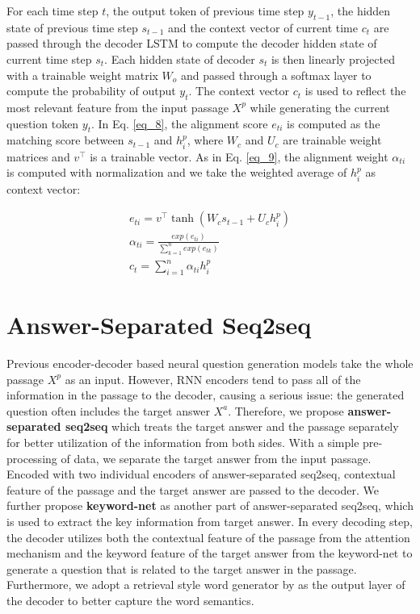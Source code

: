 \documentclass[letterpaper]{article} %
\begin{document}
For each time step \(t\), the output token of previous time step \(y_{t-1}\), the hidden state of previous time step \(s_{t-1}\) and the context vector of current time \(c_t\) are passed through the decoder LSTM to compute the decoder hidden state of current time step \(s_t\). Each hidden state of decoder \(s_{t}\) is then linearly projected with a trainable weight matrix \(W_o\) and passed through a softmax layer to compute the probability of output \(y_t\). The context vector \(c_t\) is used to reflect the most relevant feature from the input passage \(X^p\) while generating the current question token \(y_t\).  In Eq. \eqref{eq_8},  the alignment score \(e_{ti}\) is computed as the matching score between \(s_{t-1}\) and \(h^p_i\), where \(W_c\) and \(U_c\) are trainable weight matrices and \(v^{\top}\) is a trainable vector. As in Eq. \eqref{eq_9}, the alignment weight \(\alpha_{ti}\) is computed with normalization and we take the weighted average of \(h^p_i\) as context vector:

\begin{gather}
e_{ti} = v^{\top}\tanh(W_cs_{t-1} + U_ch^p_i) \label{eq_8} \\
\alpha_{ti} = \frac{exp(e_{ti})}{\sum^{n}_{k=1}exp(e_{tk})} \label{eq_9} \\
c_t = \sum^{n}_{i=1}\alpha_{ti}h^p_i \label{eq_10}
\end{gather}

\section{Answer-Separated Seq2seq}
Previous encoder-decoder based neural question generation models take the whole passage \(X^p\) as an input. However, RNN encoders tend to pass all of the information in the passage to the decoder, causing a serious issue: the generated question often includes the target answer \(X^a\). Therefore, we propose \textbf{answer-separated seq2seq} which treats the target answer and the passage separately for better utilization of the information from both sides. With a simple pre-processing of data, we separate the target answer from the input passage. Encoded with two individual encoders of answer-separated seq2seq, contextual feature of the passage and the target answer are passed to the decoder. We further propose \textbf{keyword-net} as another part of answer-separated seq2seq, which is used to extract the key information from target answer.  In every decoding step, the decoder utilizes both the contextual feature of the passage from the attention mechanism and the keyword feature of the target answer from the keyword-net to generate a question that is related to the target answer in the passage. Furthermore, we adopt a retrieval style word generator by \cite{ma2018query} as the output layer of the decoder to better capture the word semantics.
\end{document}
